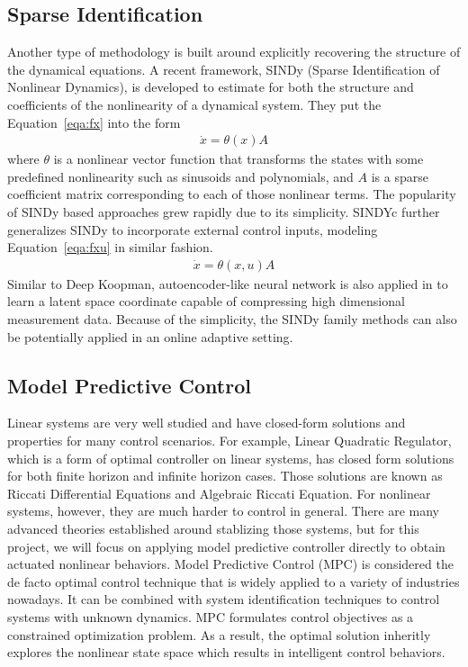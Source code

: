 \documentclass[10pt,twocolumn]{article}
\begin{document}
\subsection{Sparse Identification}
Another type of methodology is built around explicitly recovering the structure of
the dynamical equations. A recent framework, SINDy \cite{sindy} (Sparse Identification of
Nonlinear Dynamics), is developed to estimate
for both the structure and coefficients of the nonlinearity of a dynamical system.
They put the Equation~\ref{eqa:fx} into the form
\begin{gather}\label{eqa:sindy}
  \dot{x} = \theta(x) A
\end{gather}
where $\theta$ is a nonlinear vector function that transforms the states with
some predefined nonlinearity such as sinusoids and polynomials, and $A$ is a sparse
coefficient matrix corresponding to each of those nonlinear terms. The popularity
of SINDy based approaches grew rapidly due to its simplicity. SINDYc \cite{sindyc} further
generalizes SINDy to incorporate external control inputs, modeling Equation~\ref{eqa:fxu}
in similar fashion.
\begin{gather}\label{eqa:sindyc}
  \dot{x} = \theta(x, u) A
\end{gather}
Similar to Deep Koopman, autoencoder-like neural network is also applied in \cite{deepsindy}
to learn a latent space coordinate capable of compressing high dimensional measurement
data. Because of the simplicity, the SINDy family methods can also be potentially applied
in an online adaptive setting.

\subsection{Model Predictive Control}

Linear systems are very well studied and have closed-form solutions and properties
for many control scenarios. For example, Linear Quadratic Regulator, which is a form of
optimal controller on linear systems, has closed form solutions for both finite horizon
and infinite horizon cases. Those solutions are known as Riccati Differential Equations
and Algebraic Riccati Equation. For nonlinear systems, however, they are much harder to
control in general. There are many advanced
theories established around stablizing those systems, but for this project, we will
focus on applying model predictive controller directly to obtain actuated nonlinear
behaviors. Model Predictive Control (MPC) is considered the de facto optimal control
technique that is widely applied to a variety of industries nowadays. It can be combined
with system identification techniques to control systems with unknown dynamics. MPC formulates
control objectives as a constrained optimization problem. As a result, the optimal solution
inheritly explores the nonlinear state space which results in intelligent control behaviors.
\end{document}
